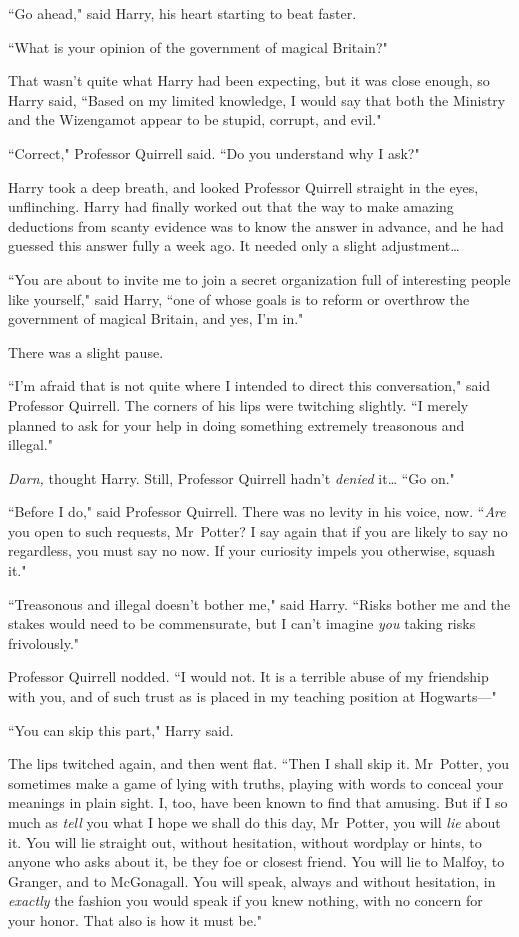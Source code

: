 ``Go ahead," said Harry, his heart starting to beat faster.

``What is your opinion of the government of magical Britain?"

That wasn't quite what Harry had been expecting, but it was close enough, so Harry said, ``Based on my limited knowledge, I would say that both the Ministry and the Wizengamot appear to be stupid, corrupt, and evil."

``Correct," Professor Quirrell said. ``Do you understand why I ask?"

Harry took a deep breath, and looked Professor Quirrell straight in the eyes, unflinching. Harry had finally worked out that the way to make amazing deductions from scanty evidence was to know the answer in advance, and he had guessed this answer fully a week ago. It needed only a slight adjustment{\ldots}

``You are about to invite me to join a secret organization full of interesting people like yourself," said Harry, ``one of whose goals is to reform or overthrow the government of magical Britain, and yes, I'm in."

There was a slight pause.

``I'm afraid that is not quite where I intended to direct this conversation," said Professor Quirrell. The corners of his lips were twitching slightly. ``I merely planned to ask for your help in doing something extremely treasonous and illegal."

\emph{Darn,} thought Harry. Still, Professor Quirrell hadn't \emph{denied} it{\ldots} ``Go on."

``Before I do," said Professor Quirrell. There was no levity in his voice, now. ``\emph{Are} you open to such requests, Mr~Potter? I say again that if you are likely to say no regardless, you must say no now. If your curiosity impels you otherwise, squash it."

``Treasonous and illegal doesn't bother me," said Harry. ``Risks bother me and the stakes would need to be commensurate, but I can't imagine \emph{you} taking risks frivolously."

Professor Quirrell nodded. ``I would not. It is a terrible abuse of my friendship with you, and of such trust as is placed in my teaching position at Hogwarts—"

``You can skip this part," Harry said.

The lips twitched again, and then went flat. ``Then I shall skip it. Mr~Potter, you sometimes make a game of lying with truths, playing with words to conceal your meanings in plain sight. I, too, have been known to find that amusing. But if I so much as \emph{tell} you what I hope we shall do this day, Mr~Potter, you will \emph{lie} about it. You will lie straight out, without hesitation, without wordplay or hints, to anyone who asks about it, be they foe or closest friend. You will lie to Malfoy, to Granger, and to McGonagall. You will speak, always and without hesitation, in \emph{exactly} the fashion you would speak if you knew nothing, with no concern for your honor. That also is how it must be."

